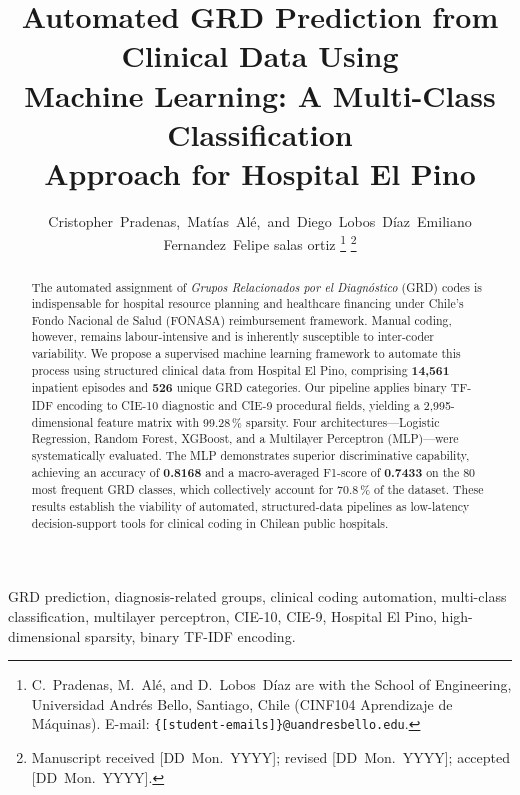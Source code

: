 \documentclass[journal]{IEEEtran}
\begin{document}
\title{Automated GRD Prediction from Clinical Data Using\\
       Machine Learning: A Multi-Class Classification\\
       Approach for Hospital El Pino}

\author{Cristopher~Pradenas,~Mat\'ias~Al\'e,~and~Diego~Lobos~D\'iaz~Emiliano Fernandez~Felipe salas ortiz%
  \thanks{C.~Pradenas, M.~Al\'e, and D.~Lobos~D\'iaz are with
          the School of Engineering, Universidad Andr\'es Bello,
          Santiago, Chile (CINF104 Aprendizaje de M\'aquinas).
          E-mail: \texttt{\{[student-emails]\}@uandresbello.edu}.}%
  \thanks{Manuscript received [DD~Mon.\ YYYY]; revised
          [DD~Mon.\ YYYY]; accepted [DD~Mon.\ YYYY].}}

\maketitle

\begin{abstract}
The automated assignment of \emph{Grupos Relacionados por el
Diagn\'ostico} (GRD) codes is indispensable for hospital
resource planning and healthcare financing under Chile's Fondo
Nacional de Salud (FONASA) reimbursement framework.  Manual
coding, however, remains labour-intensive and is inherently
susceptible to inter-coder variability.  We propose a supervised
machine learning framework to automate this process using
structured clinical data from Hospital El Pino, comprising
\textbf{14,561} inpatient episodes and \textbf{526} unique GRD
categories.  Our pipeline applies binary TF-IDF encoding to
CIE-10 diagnostic and CIE-9 procedural fields, yielding a
2,995-dimensional feature matrix with 99.28\,\% sparsity.
Four architectures---Logistic Regression, Random Forest,
XGBoost, and a Multilayer Perceptron (MLP)---were systematically
evaluated.  The MLP demonstrates superior discriminative
capability, achieving an accuracy of \textbf{0.8168} and a
macro-averaged F1-score of \textbf{0.7433} on the 80 most
frequent GRD classes, which collectively account for 70.8\,\%
of the dataset.  These results establish the viability of
automated, structured-data pipelines as low-latency
decision-support tools for clinical coding in Chilean public
hospitals.
\end{abstract}

\begin{IEEEkeywords}
GRD prediction, diagnosis-related groups, clinical coding
automation, multi-class classification, multilayer perceptron,
CIE-10, CIE-9, Hospital El Pino, high-dimensional sparsity,
binary TF-IDF encoding.
\end{IEEEkeywords}
\end{document}
